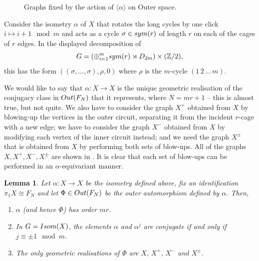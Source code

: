 \documentclass[11pt, a4 paper]{amsart}
\numberwithin{equation}{section}
\newtheorem{lemma}[theorem]{Lemma}
\theoremstyle{remark}
\theoremstyle{definition}
\def\Z{\mathbb Z}
\def\outN{{\rm{Out}}(F_N)}
\def\sym{{\rm{sym}}}
\def\<{\langle}
\def\>{\rangle}
\begin{document}
\begin{figure}
{
}

	\caption{Graphs fixed by the action of $\<\alpha\>$ on Outer space.}
	\label{fig:realisations}
\end{figure}

Consider the isometry $\alpha$ 
of $X$ that rotates the long cycles by one click $i\mapsto i+1 \mod m$ and acts as a cycle 
$\sigma\in \sym(r)$ of
length $r$ on each of the cages of $r$ edges. In the displayed decomposition of 
$$G=(\oplus_{i=1}^m\sym(r)\rtimes D_{2m})\times (\Z/2),$$
this has the form $((\sigma,\dots,\sigma), \rho, 0)$ 
where $\rho$ is the $m$-cycle $(1\, 2\, \dots \, m)$.

\smallskip

We would like to say that  $\alpha:X\to X$ is 
the unique geometric realisation 
of the conjugacy class in $\outN$ that it represents, 
where $N=mr+1$ 
-- this is almost true, but not quite. 
We also have to consider the graph $X^+$ obtained from $X$ 
by blowing-up the vertices in the outer circuit, 
separating it from the incident $r$-cage with a new edge; 
we have to consider the graph $X^-$ obtained from $X$ 
by modifying each vertex of the inner circuit instead; 
and we need the graph $X^\pm$
that is obtained from $X$ 
by performing both sets of blow-ups. 
All of the graphs $X, X^+, X^-, X^\pm$ are shown 
in . 
It is clear that each set of blow-ups 
can be performed in an $\alpha$-equivariant manner. 

\begin{lemma} 
\label{l1}
	Let $\alpha:X\to X$ be the isometry defined above, fix an identification $\pi_1X\cong F_N$
	and let $\Phi\in\outN$ be the outer automorphism defined by $\alpha$. Then, 
	\begin{enumerate}
		\item 
			$\alpha$ (and hence $\Phi$) has order $mr$.
		\item 
			In $G ={{\rm{Isom}}}(X)$, 
			the elements $\alpha$ and $\alpha^j$ are conjugate 
			if and only if $j \equiv \pm 1 \mod m$. 
		\item 
			The only geometric realisations of $\Phi$ 
			are $X,\, X^+,\, X^-$ and $X^\pm$. 
	\end{enumerate} 
\end{lemma}
\end{document}
